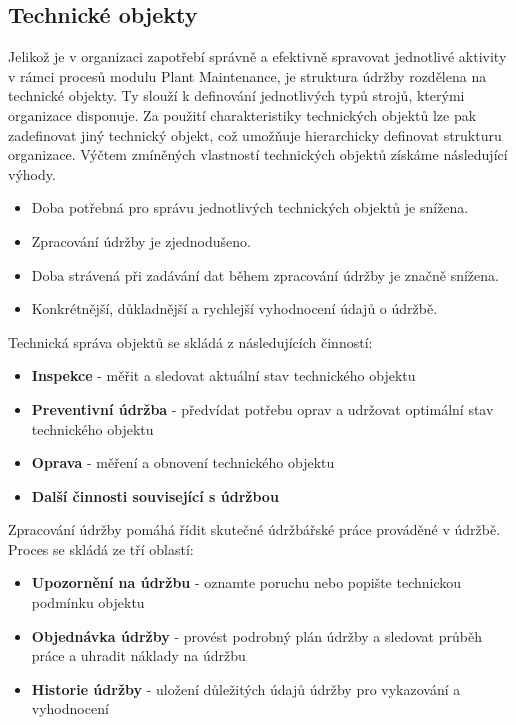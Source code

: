 \documentclass[thesis=M,czech]{FITthesis}[2012/06/26]
\begin{document}
\subsection{Technické objekty}
Jelikož je v organizaci zapotřebí správně a efektivně spravovat jednotlivé aktivity v rámci procesů modulu Plant Maintenance, je struktura údržby rozdělena na technické objekty. Ty slouží k definování jednotlivých typů strojů, kterými organizace disponuje. Za použití charakteristiky technických objektů lze pak zadefinovat jiný technický objekt, což umožňuje hierarchicky definovat strukturu organizace. Výčtem zmíněných vlastností technických objektů získáme následující výhody.
\begin{itemize}
	\item
	Doba potřebná pro správu jednotlivých technických objektů je snížena.
	\item
	Zpracování údržby je zjednodušeno.
	\item
	Doba strávená při zadávání dat během zpracování údržby je značně snížena.
	\item
	Konkrétnější, důkladnější a rychlejší vyhodnocení údajů o údržbě.
\end{itemize}
Technická správa objektů se skládá z následujících činností:
\begin{itemize}
	\item
	\textbf{Inspekce} - měřit a sledovat aktuální stav technického objektu
	\item
	\textbf{Preventivní údržba} - předvídat potřebu oprav a udržovat optimální stav technického objektu
	\item
	\textbf{Oprava} - měření a obnovení technického objektu
	\item
	\textbf{Další činnosti související s údržbou}
\end{itemize}

\vspace*{0.5cm}
Zpracování údržby pomáhá řídit skutečné údržbářské práce prováděné v údržbě. Proces se skládá ze tří oblastí:
\begin{itemize}
	\item
	\textbf{Upozornění na údržbu} -  oznamte poruchu nebo popište technickou podmínku objektu
	\item
	\textbf{Objednávka údržby} - provést podrobný plán údržby a sledovat průběh práce a uhradit náklady na údržbu
	\item
	\textbf{Historie údržby} - uložení důležitých údajů údržby pro vykazování a vyhodnocení
\end{itemize} 	
\end{document}
